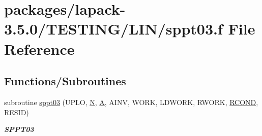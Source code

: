 \hypertarget{sppt03_8f}{}\section{packages/lapack-\/3.5.0/\+T\+E\+S\+T\+I\+N\+G/\+L\+I\+N/sppt03.f File Reference}
\label{sppt03_8f}
\subsection*{Functions/\+Subroutines}
\begin{DoxyCompactItemize}
\item 
subroutine \hyperlink{group__single__lin_gab917ea72fc42c77d380c5e89732cd5b8}{sppt03} (U\+P\+L\+O, \hyperlink{polmisc_8c_a0240ac851181b84ac374872dc5434ee4}{N}, \hyperlink{classA}{A}, A\+I\+N\+V, W\+O\+R\+K, L\+D\+W\+O\+R\+K, R\+W\+O\+R\+K, \hyperlink{superlu__enum__consts_8h_af00a42ecad444bbda75cde1b64bd7e72a9b5c151728d8512307565994c89919d5}{R\+C\+O\+N\+D}, R\+E\+S\+I\+D)
\begin{DoxyCompactList}\small\item\em {\bfseries S\+P\+P\+T03} \end{DoxyCompactList}\end{DoxyCompactItemize}
